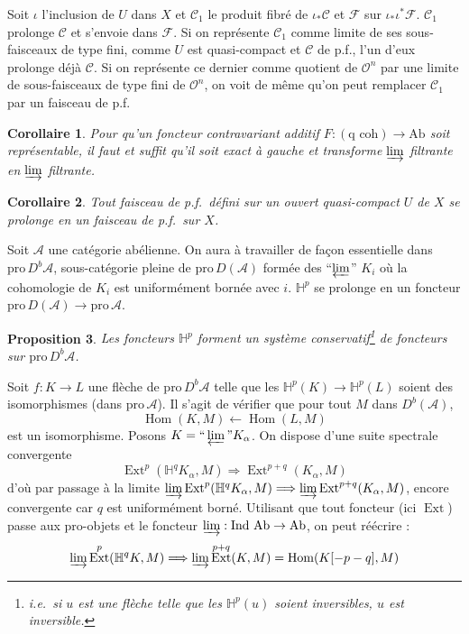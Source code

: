 \documentclass[12pt]{amsart}
\theoremstyle{plain}
\newtheorem{prop}{Proposition}[section]
\newtheorem{cor}[prop]{Corollaire}
\theoremstyle{definition}
\DeclareMathOperator{\Hom}{Hom}
\DeclareMathOperator{\Ext}{Ext}
\newcommand{\Ind}{\text{Ind}\,}
\newcommand{\Pro}{\text{pro}\,}
\newcommand{\Ab}{\text{Ab}}
\newcommand{\cF}{\mathcal{F}}
\newcommand{\cO}{\mathcal{O}}
\newcommand{\cC}{\mathcal{C}}
\newcommand{\cA}{\mathcal{A}}
\newcommand{\cDb}{D^{b}}
\newcommand{\cD}{D}
\newcommand{\bH}{\mathbb{H}}
\begin{document}
Soit $\iota$ l'inclusion de $U$ dans $X$ et $\cC_{1}$ le produit fibr\'e de $\iota_{*}\cC$ et $\cF$ sur $\iota_{*}\iota^{*}\cF$. $\cC_{1}$ prolonge $\cC$ et s'envoie dans $\cF$. Si on repr\'esente $\cC_{1}$ comme limite de ses sous-faisceaux de type fini, comme $U$ est quasi-compact et $\cC$ de p.f., l'un d'eux prolonge d\'ej\`a $\cC$. Si on repr\'esente ce dernier comme quotient de $\cO^{n}$ par une limite de sous-faisceaux de type fini de $\cO^{n}$, on voit de m\^eme qu'on peut remplacer $\cC_{1}$ par un faisceau de p.f.

\begin{cor}
Pour qu'un foncteur contravariant additif $F: (\text{q coh}) \to \Ab$ soit repr\'esentable, il faut et suffit qu'il soit exact \`a gauche et transforme $\varinjlim$ filtrante en $\varinjlim$ filtrante.
\end{cor}

\begin{cor}
Tout faisceau de p.f.\ d\'efini sur un ouvert quasi-compact $U$ de $X$ se prolonge en un faisceau de p.f.\ sur $X$.
\end{cor}

\medskip

Soit $\cA$ une cat\'egorie ab\'elienne. On aura \`a travailler de fa\c{c}on essentielle dans $\Pro \cDb\cA$, sous-cat\'egorie pleine de $\Pro \cD(\cA)$ form\'ee des ``$\varprojlim$'' $K_{i}$ o\`u la cohomologie de $K_{i}$ est uniform\'ement born\'ee avec $i$. $\bH^{p}$ se prolonge en un foncteur $\Pro \cD(\cA) \to \Pro \cA$.

\begin{prop}
Les foncteurs $\bH^{p}$ forment un syst\`eme conservatif\footnote{i.e.\ si $u$ est une fl\`eche telle que les $\bH^{p}(u)$ soient inversibles, $u$ est inversible.} de foncteurs sur $\Pro \cDb\cA$.
\end{prop}

Soit $f: K \to L$ une fl\`eche de $\Pro \cDb\cA$ telle que les $\bH^{p}(K) \to \bH^{p}(L)$ soient des isomorphismes (dans $\Pro \cA$). Il s'agit de v\'erifier que pour tout $M$ dans $\cDb(\cA)$,
\[
\Hom(K,M) \longleftarrow \Hom(L,M)
\]
est un isomorphisme. Posons $K = \text{``}\varprojlim\text{''} K_{\alpha}$. On dispose d'une suite spectrale convergente
\[
\Ext^{p}(\bH^{q}K_{\alpha}, M) \Longrightarrow \Ext^{p+q}(K_{\alpha}, M)
\]
d'o\`u par passage \`a la limite $\varinjlim \Ext^{p}(\bH^{q}K_{\alpha}, M) \Longrightarrow \varinjlim \Ext^{p+q}(K_{\alpha}, M)$, encore convergente car $q$ est uniform\'ement born\'e. Utilisant que tout foncteur (ici $\Ext$) passe aux pro-objets et le foncteur $\varinjlim: \Ind\,\Ab \to \Ab$, on peut r\'e\'ecrire :
\[
\varinjlim \Ext^{p}(\bH^{q}K, M) \Longrightarrow \varinjlim \Ext^{p+q}(K,M) = \Hom(K[-p-q],M)
\]
\end{document}

